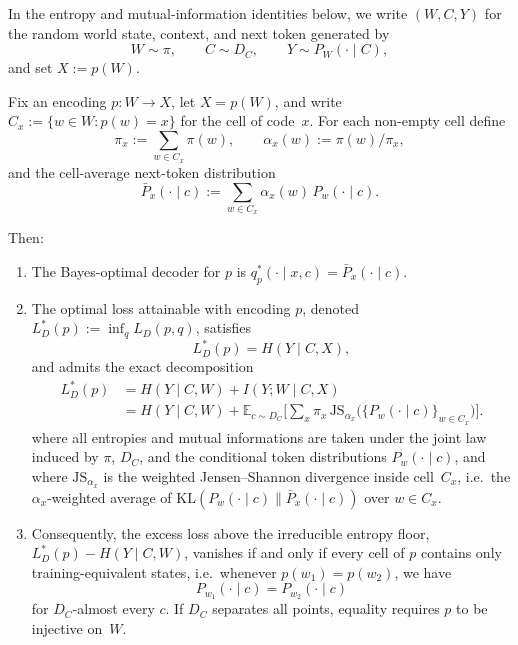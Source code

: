 \documentclass[twoside,11pt]{article}
\newcommand{\E}{\mathbb{E}}
\newcommand{\JS}{\mathrm{JS}}
\newcommand{\KL}{\mathrm{KL}}
\begin{document}
In the entropy and mutual-information identities below, we write $(W,C,Y)$ for the random world state, context, and next token generated by
\[
W \sim \pi,
\qquad
C \sim D_C,
\qquad
Y \sim P_W(\cdot \mid C),
\]
and set $X := p(W)$.

\begin{theorem}\label{thm:ce-decomposition}
Fix an encoding $p \colon W \to X$, let $X = p(W)$, and write $C_x := \{w \in W : p(w)=x\}$ for the cell of code~$x$. For each non-empty cell define
\[
\pi_x := \sum_{w \in C_x} \pi(w),
\qquad
\alpha_x(w) := \pi(w)/\pi_x,
\]
and the cell-average next-token distribution
\[
\bar P_x(\cdot \mid c)
:= \sum_{w \in C_x} \alpha_x(w)\, P_w(\cdot \mid c).
\]

Then:
\begin{enumerate}[label=(\alph*)]
\item The Bayes-optimal decoder for $p$ is
$q_p^*(\cdot \mid x,c) = \bar P_x(\cdot \mid c)$.

\item The optimal loss attainable with encoding $p$, denoted
$L_D^*(p) := \inf_q L_D(p,q)$, satisfies
\[
L_D^*(p) = H(Y \mid C,X),
\]
and admits the exact decomposition
\[
\begin{aligned}
L_D^*(p)
&= H(Y \mid C,W) + I(Y;W \mid C,X) \\
&= H(Y \mid C,W)
  + \E_{c \sim D_C}
    \biggl[\sum_x \pi_x\,
    \JS_{\alpha_x}\bigl(\{P_w(\cdot \mid c)\}_{w \in C_x}\bigr)\biggr].
\end{aligned}
\]
where all entropies and mutual informations are taken under the joint law induced by $\pi$, $D_C$, and the conditional token distributions $P_w(\cdot \mid c)$, and where $\JS_{\alpha_x}$ is the weighted Jensen--Shannon divergence inside cell~$C_x$, i.e.\ the $\alpha_x$-weighted average of $\KL(P_w(\cdot\mid c)\|\bar P_x(\cdot\mid c))$ over $w \in C_x$.

\item Consequently, the excess loss above the irreducible entropy floor, $L_D^*(p) - H(Y \mid C,W)$, vanishes if and only if every cell of $p$ contains only training-equivalent states, i.e.\ whenever $p(w_1)=p(w_2)$, we have
\[
P_{w_1}(\cdot \mid c) = P_{w_2}(\cdot \mid c)
\]
for $D_C$-almost every $c$. If $D_C$ separates all points, equality requires $p$ to be injective on~$W$.
\end{enumerate}
\end{theorem}
\end{document}

